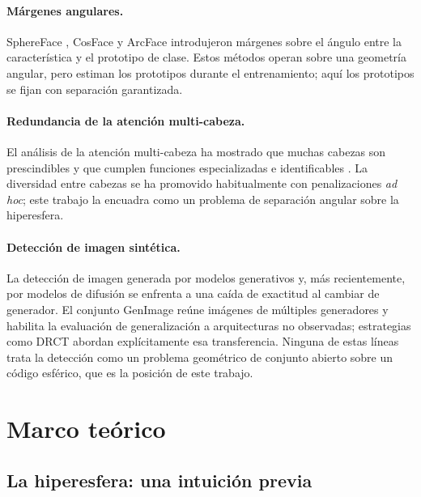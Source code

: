\documentclass[11pt,a4paper]{article}
\theoremstyle{plain}
\begin{document}
\paragraph{Márgenes angulares.}
SphereFace \cite{liu2017}, CosFace \cite{wang2018} y ArcFace
\cite{deng2019} introdujeron márgenes sobre el ángulo entre la
característica y el prototipo de clase. Estos métodos operan sobre una
geometría angular, pero estiman los prototipos durante el entrenamiento;
aquí los prototipos se fijan con separación garantizada.

\paragraph{Redundancia de la atención multi-cabeza.}
El análisis de la atención multi-cabeza ha mostrado que muchas cabezas
son prescindibles \cite{michel2019} y que cumplen funciones
especializadas e identificables \cite{voita2019}. La diversidad entre
cabezas se ha promovido habitualmente con penalizaciones \emph{ad hoc};
este trabajo la encuadra como un problema de separación angular sobre la
hiperesfera.

\paragraph{Detección de imagen sintética.}
La detección de imagen generada por modelos generativos
\cite{wang2020cnn} y, más recientemente, por modelos de difusión
\cite{corvi2023} se enfrenta a una caída de exactitud al cambiar de
generador. El conjunto GenImage \cite{zhu2023genimage} reúne imágenes de
múltiples generadores y habilita la evaluación de generalización a
arquitecturas no observadas; estrategias como DRCT \cite{chen2024drct}
abordan explícitamente esa transferencia. Ninguna de estas líneas trata
la detección como un problema geométrico de conjunto abierto sobre un
código esférico, que es la posición de este trabajo.

\section{Marco teórico}
\label{sec:theory}

\subsection{La hiperesfera: una intuición previa}
\label{sec:theory:intuition}
\end{document}
